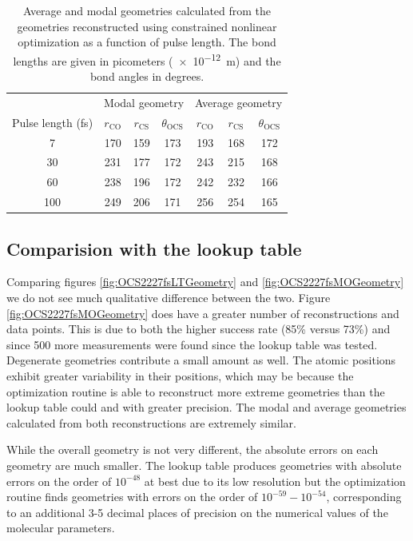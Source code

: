 \begin{table}
  \myfloatalign
  \centering
  \begin{tabularx}{0.85\textwidth}{ccccccc}
    \toprule
    & \multicolumn{3}{c}{Modal geometry} & \multicolumn{3}{c}{Average geometry} \\
    Pulse length (fs) & $r_\mathrm{CO}$ & $r_\mathrm{CS}$ & $\theta_\mathrm{OCS}$ & $r_\mathrm{CO}$ & $r_\mathrm{CS}$ & $\theta_\mathrm{OCS}$ \\
    \midrule
    7 & 170 & 159 & 173 & 193 & 168 & 172 \\
    30 & 231 & 177 & 172 & 243 & 215 & 168 \\
    60 & 238 & 196 & 172 & 242 & 232 & 166 \\
    100 & 249 & 206 & 171 & 256 & 254 & 165 \\
    \bottomrule
  \end{tabularx}
  \caption[Average and modal geometries reconstructed using constrained nonlinear optimization as a function of pulse length.]
  {Average and modal geometries calculated from the geometries reconstructed using constrained nonlinear optimization as a function of pulse length. The bond lengths are given in picometers (\SI{e-12}{\m}) and the bond angles in degrees.}
  \label{table:MOGeometries}
\end{table}


\subsection{Comparision with the lookup table}
Comparing figures \ref{fig:OCS2227fsLTGeometry} and \ref{fig:OCS2227fsMOGeometry} we do not see much qualitative difference between the two. Figure \ref{fig:OCS2227fsMOGeometry} does have a greater number of reconstructions and data points. This is due to both the higher success rate (85\% versus 73\%) and since 500 more measurements were found since the lookup table was tested. Degenerate geometries contribute a small amount as well. The atomic positions exhibit greater variability in their positions, which may be because the optimization routine is able to reconstruct more extreme geometries than the lookup table could and with greater precision. The modal and average geometries calculated from both reconstructions are extremely similar.

While the overall geometry is not very different, the absolute errors on each geometry are much smaller. The lookup table produces geometries with absolute errors on the order of $10^{-48}$ at best due to its low resolution but the optimization routine finds geometries with errors on the order of $10^{-59} - 10^{-54}$, corresponding to an additional 3-5 decimal places of precision on the numerical values of the molecular parameters.

